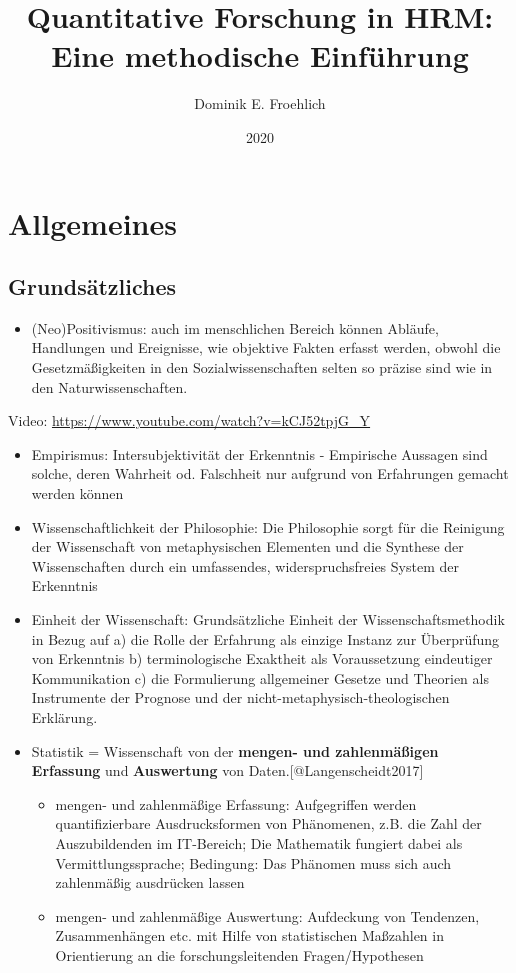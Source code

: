 \documentclass[
]{book}
\title{Quantitative Forschung in HRM: Eine methodische Einführung}
\author{Dominik E. Froehlich}
\date{2020}
\providecommand{\tightlist}{%
  \setlength{\itemsep}{0pt}\setlength{\parskip}{0pt}}
\begin{document}
\maketitle

{
\setcounter{tocdepth}{1}
\tableofcontents
}
\hypertarget{allgemeines}{%
\chapter{Allgemeines}\label{allgemeines}}

\hypertarget{grundsuxe4tzliches}{%
\section{Grundsätzliches}\label{grundsuxe4tzliches}}

\begin{itemize}
\tightlist
\item
  (Neo)Positivismus: auch im menschlichen Bereich können Abläufe, Handlungen und Ereignisse, wie objektive Fakten erfasst werden, obwohl die Gesetzmäßigkeiten in den Sozialwissenschaften selten so präzise sind wie in den Naturwissenschaften.
\end{itemize}

Video: \url{https://www.youtube.com/watch?v=kCJ52tpjG_Y}

\begin{itemize}
\tightlist
\item
  Empirismus: Intersubjektivität der Erkenntnis - Empirische Aussagen sind solche, deren Wahrheit od. Falschheit nur aufgrund von Erfahrungen gemacht werden können
\item
  Wissenschaftlichkeit der Philosophie: Die Philosophie sorgt für die Reinigung der Wissenschaft von metaphysischen Elementen und die Synthese der Wissenschaften durch ein umfassendes, widerspruchsfreies System der Erkenntnis
\item
  Einheit der Wissenschaft: Grundsätzliche Einheit der Wissenschaftsmethodik in Bezug auf a) die Rolle der Erfahrung als einzige Instanz zur Überprüfung von Erkenntnis b) terminologische Exaktheit als Voraussetzung eindeutiger Kommunikation c) die Formulierung allgemeiner Gesetze und Theorien als Instrumente der Prognose und der nicht-metaphysisch-theologischen Erklärung.
\item
  Statistik = Wissenschaft von der \textbf{mengen- und zahlenmäßigen Erfassung} und \textbf{Auswertung} von Daten.{[}@Langenscheidt2017{]}

  \begin{itemize}
  \tightlist
  \item
    mengen- und zahlenmäßige Erfassung: Aufgegriffen werden quantifizierbare Ausdrucksformen von Phänomenen, z.B. die Zahl der Auszubildenden im IT-Bereich; Die Mathematik fungiert dabei als Vermittlungssprache; Bedingung: Das Phänomen muss sich auch zahlenmäßig ausdrücken lassen
  \item
    mengen- und zahlenmäßige Auswertung: Aufdeckung von Tendenzen, Zusammenhängen etc. mit Hilfe von statistischen Maßzahlen in Orientierung an die forschungsleitenden Fragen/Hypothesen
  \end{itemize}
\end{itemize}
\end{document}
